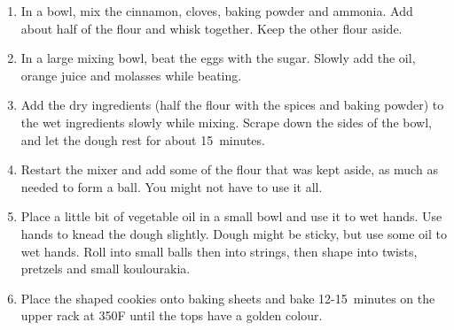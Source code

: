 \begin{enumerate}
    \item In a bowl, mix the cinnamon, cloves, baking powder and ammonia. Add about half of the flour and whisk together. Keep the other flour aside.
    \item In a large mixing bowl, beat the eggs with the sugar. Slowly add the oil, orange juice and molasses while beating.
    \item Add the dry ingredients (half the flour with the spices and baking powder) to the wet ingredients slowly while mixing. Scrape down the sides of the bowl, and let the dough rest for about 15~minutes.
    \item Restart the mixer and add some of the flour that was kept aside, as much as needed to form a ball. You might not have to use it all.
    \item Place a little bit of vegetable oil in a small bowl and use it to wet hands. Use hands to knead the dough slightly. Dough might be sticky, but use some oil to wet hands. Roll into small balls then into strings, then shape into twists, pretzels and small koulourakia.
    \item Place the shaped cookies onto baking sheets and bake 12-15~minutes on the upper rack at 350\degree F until the tops have a golden colour.
\end{enumerate}

